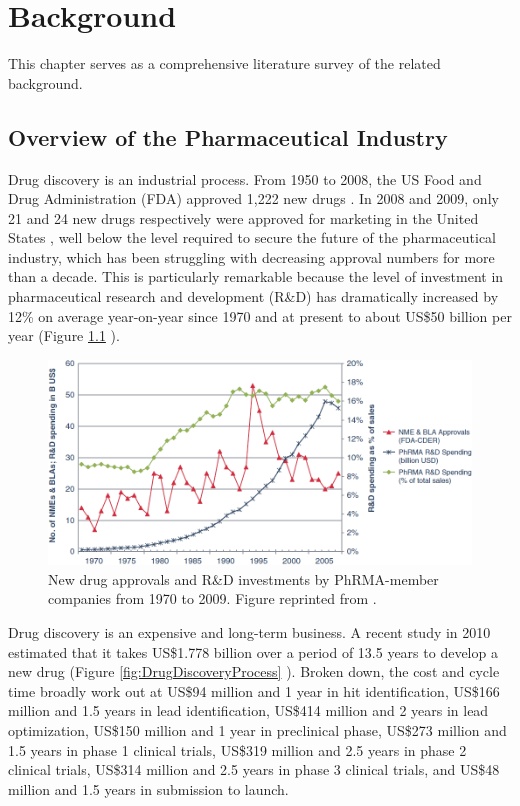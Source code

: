 \chapter{Background}

This chapter serves as a comprehensive literature survey of the related background.

\section{Overview of the Pharmaceutical Industry}

Drug discovery is an industrial process. From 1950 to 2008, the US Food and Drug Administration (FDA) approved 1,222 new drugs \citep{717-2009}. In 2008 and 2009, only 21 and 24 new drugs respectively were approved for marketing in the United States \citep{716-2010}, well below the level required to secure the future of the pharmaceutical industry, which has been struggling with decreasing approval numbers for more than a decade. This is particularly remarkable because the level of investment in pharmaceutical research and development (R\&D) has dramatically increased by 12\% on average year-on-year since 1970 and at present to about US\$50 billion per year (Figure \ref{fig:NewDrugApprovals} \citep{686-2011}).

\begin{figure}
\centering
\includegraphics[width=\textwidth]{Background/Figures/NewDrugApprovals.png}
\caption{New drug approvals and R\&D investments by PhRMA-member companies from 1970 to 2009. Figure reprinted from \citep{686-2011}.}
\label{fig:NewDrugApprovals}
\end{figure}

Drug discovery is an expensive and long-term business. A recent study in 2010 estimated that it takes US\$1.778 billion over a period of 13.5 years to develop a new drug (Figure \ref{fig:DrugDiscoveryProcess} \citep{716-2010}). Broken down, the cost and cycle time broadly work out at US\$94 million and 1 year in hit identification, US\$166 million and 1.5 years in lead identification, US\$414 million and 2 years in lead optimization, US\$150 million and 1 year in preclinical phase, US\$273 million and 1.5 years in phase 1 clinical trials, US\$319 million and 2.5 years in phase 2 clinical trials, US\$314 million and 2.5 years in phase 3 clinical trials, and US\$48 million and 1.5 years in submission to launch.

